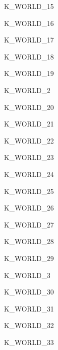 \begin{datadesc}{K_WORLD_15}
\end{datadesc}
\begin{datadesc}{K_WORLD_16}
\end{datadesc}
\begin{datadesc}{K_WORLD_17}
\end{datadesc}
\begin{datadesc}{K_WORLD_18}
\end{datadesc}
\begin{datadesc}{K_WORLD_19}
\end{datadesc}
\begin{datadesc}{K_WORLD_2}
\end{datadesc}
\begin{datadesc}{K_WORLD_20}
\end{datadesc}
\begin{datadesc}{K_WORLD_21}
\end{datadesc}
\begin{datadesc}{K_WORLD_22}
\end{datadesc}
\begin{datadesc}{K_WORLD_23}
\end{datadesc}
\begin{datadesc}{K_WORLD_24}
\end{datadesc}
\begin{datadesc}{K_WORLD_25}
\end{datadesc}
\begin{datadesc}{K_WORLD_26}
\end{datadesc}
\begin{datadesc}{K_WORLD_27}
\end{datadesc}
\begin{datadesc}{K_WORLD_28}
\end{datadesc}
\begin{datadesc}{K_WORLD_29}
\end{datadesc}
\begin{datadesc}{K_WORLD_3}
\end{datadesc}
\begin{datadesc}{K_WORLD_30}
\end{datadesc}
\begin{datadesc}{K_WORLD_31}
\end{datadesc}
\begin{datadesc}{K_WORLD_32}
\end{datadesc}
\begin{datadesc}{K_WORLD_33}
\end{datadesc}
